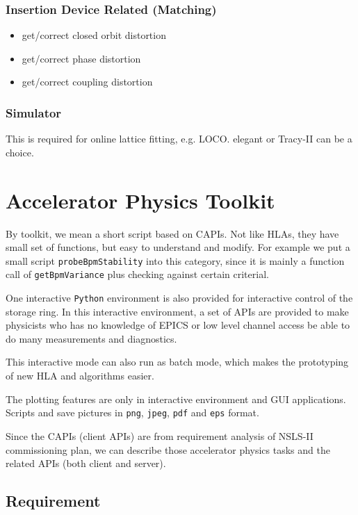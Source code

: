 \documentclass[11pt,oneside,letterpaper,showtrims,article]{memoir}
\newcommand{\code}[1]{\texttt{#1}}
\begin{document}
\subsection{Insertion Device Related (Matching)}

\begin{itemize}%
\item get/correct closed orbit distortion
\item get/correct phase distortion
\item get/correct coupling distortion
\end{itemize}

\subsection{Simulator}

This is required for online lattice fitting, e.g. LOCO. elegant or Tracy-II can be a choice.



\chapter{\label{chap:aptoolkit}Accelerator Physics Toolkit}

By toolkit, we mean a short script based on CAPIs. Not like HLAs, they
have small set of functions, but easy to understand and modify. For
example we put a small script \code{probeBpmStability} into this category,
since it is mainly a function call of \code{getBpmVariance} plus checking
against certain criterial.

One interactive \code{Python} environment is also provided for
interactive control of the storage ring. In this interactive
environment, a set of APIs are provided to make physicists who has no
knowledge of EPICS or low level channel access be able to do many
measurements and diagnostics.

This interactive mode can also run as batch mode, which makes the
prototyping of new HLA and algorithms easier.

The plotting features are only in interactive environment and GUI
applications. Scripts and save pictures in \code{png}, \code{jpeg},
\code{pdf} and \code{eps} format.

Since the CAPIs (client APIs) are from requirement analysis of NSLS-II
commissioning plan, we can describe those accelerator physics tasks and
the related APIs (both client and server).

\section{Requirement}
\end{document}
